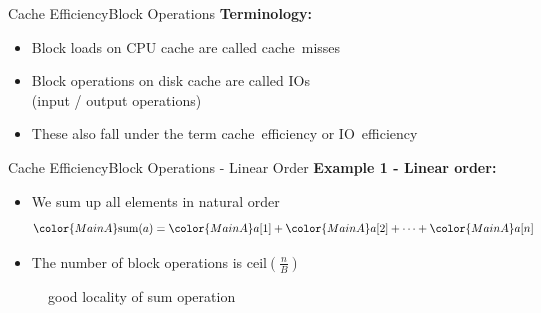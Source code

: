 
\begin{frame}{Cache Efficiency}{Block Operations}
  \textbf{Terminology:}
  \begin{itemize}
    \item<2->
      Block loads on CPU cache are called {\color{MainA}cache~misses}
    \item<3->
      Block operations on disk cache are called {\color{MainA}IOs}\\
      (input / output operations)
    \item<4->
      These also fall under the term {\color{MainA}cache~efficiency} or
      {\color{MainA}IO~efficiency}
  \end{itemize}
\end{frame}


\begin{frame}{Cache Efficiency}{Block Operations - Linear Order}
  \vspace{-1.0em}
  \textbf{Example 1 - Linear order:}
  \begin{itemize}
    \item<2->
      We sum up all elements in {\color{MainA}natural order}
      \begin{displaymath}
        {\color{MainA}\mathrm{sum}(a)} =
        {\color{MainA}a[1]} +
        {\color{MainA}a[2]} +
        \dots +
        {\color{MainA}a[n]}
      \end{displaymath}
    \item<3->
      The number of block operations is
      {\color{MainA}$\mathrm{ceil}\left(\frac{n}{B}\right)$}
  \end{itemize}
  \vspace{-1.0em}
  \begin{figure}%
    \begin{adjustbox}{width=\linewidth}%
    \end{adjustbox}%
    \caption{good locality of sum operation}
    \label{fig:caching:memory_locality_linear}
  \end{figure}%
\end{frame}



